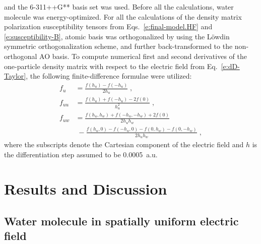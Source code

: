 \documentclass[aip,amsmath,amssymb,reprint,floatfix]{revtex4-1}
\begin{document}
and the 6-311++G** basis set\cite{Krishnan.Binkley.Seeger.Pople.JCP.1980}
was used. Before all the calculations, water molecule was energy\hyp{}optimized.
For all the calculations of the density matrix polarization susceptibility tensors
from Eqs.~\eqref{e:final-model.HF} and \eqref{e:susceptibility-B}, 
atomic basis was orthogonalized by using the L{\"o}wdin symmetric orthogonalization scheme,\cite{Mayer.IJQC.2002}
and further back\hyp{}transformed to the non\hyp{}orthogonal AO basis.
To compute numerical first and second derivatives of the one\hyp{}particle density matrix
with respect to the electric field from Eq.~\eqref{e:dD-Taylor}, 
the following finite\hyp{}difference formulae were utilized:
%
\begin{subequations}\label{e:ff}
  \begin{align}
    f_u    &= \frac{f(h_u) - f(-h_u)}{2h_u} \;,\\
    f_{uu} &= \frac{f(h_u) + f(-h_u) - 2f(0)}{h_u^2} \;,\\
    f_{uw} &= \frac{f(h_u,h_w) + f(-h_u,-h_w) + 2f(0)}{2h_uh_w} \nonumber \\ 
           & \; -\frac{f(h_u,0) - f(-h_u,0) - f(0,h_w) - f(0,-h_w)}{2h_uh_w} \;,
  \end{align}
\end{subequations}
%
where 
the subscripts denote the Cartesian component of the electric field and $h$ is the differentiation step
assumed to be 0.0005~a.u. 

\section{\label{s:4}Results and Discussion}

\subsection{\label{ss:41}Water molecule in spatially uniform electric field}
\end{document}
